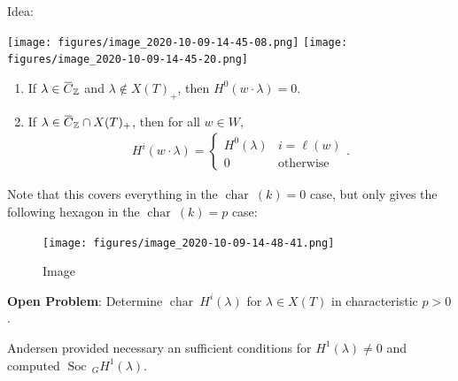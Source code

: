 Idea:

\texttt{[image: figures/image\_2020-10-09-14-45-08.png]}
\texttt{[image: figures/image\_2020-10-09-14-45-20.png]}

\begin{theorem}

\begin{theorem}

\begin{enumerate}
\def\labelenumi{\alph{enumi}.}
\item
  If
  \(\lambda \in \mkern 1.5mu\overline{\mkern-1.5muC\mkern-1.5mu}\mkern 1.5mu_{\mathbb{Z}}\)
  and \(\lambda \not\in X(T)_+\), then \(H^0(w\cdot \lambda) = 0\).
\item
  If
  \(\lambda \in \mkern 1.5mu\overline{\mkern-1.5muC\mkern-1.5mu}\mkern 1.5mu_{\mathbb{Z}}\cap X(T)_+\),
  then for all \(w\in W\),
  \begin{align*}       H^i(w\cdot \lambda) =      \begin{cases}     H^0(\lambda) & i= \ell(w) \\     0 & \text{otherwise}     \end{cases}     .\end{align*}
\end{enumerate}

\end{theorem}

\end{theorem}

Note that this covers everything in the \(\operatorname{char}~(k) = 0\)
case, but only gives the following hexagon in the
\(\operatorname{char}~(k) = p\) case:

\begin{figure}
\centering
\texttt{[image: figures/image\_2020-10-09-14-48-41.png]}
\caption{Image}
\end{figure}

\begin{remark}

\begin{remark}

\textbf{Open Problem}: Determine \(\operatorname{char}~H^i(\lambda)\)
for \(\lambda\in X(T)\) in characteristic \(p>0\).

Andersen provided necessary an sufficient conditions for
\(H^1(\lambda) \neq 0\) and computed
\(\operatorname{Soc}\,_G H^1(\lambda)\).

\end{remark}

\end{remark}

